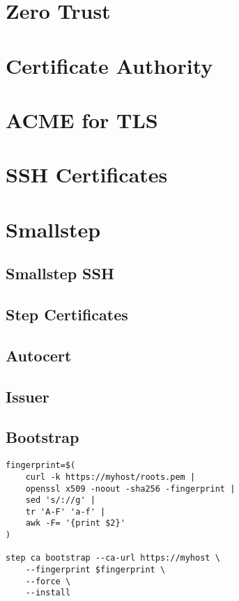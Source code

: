 \section{Zero Trust}

\section{Certificate Authority}

\section{ACME for TLS}

\section{SSH Certificates}

\section{Smallstep}

\subsection{Smallstep SSH}

\subsection{Step Certificates}

\subsection{Autocert}

\subsection{Issuer}

\subsection{Bootstrap}

\begin{verbatim}
fingerprint=$(
    curl -k https://myhost/roots.pem | 
    openssl x509 -noout -sha256 -fingerprint | 
    sed 's/://g' | 
    tr 'A-F' 'a-f' | 
    awk -F= '{print $2}'
)

step ca bootstrap --ca-url https://myhost \
    --fingerprint $fingerprint \
    --force \
    --install
\end{verbatim}

